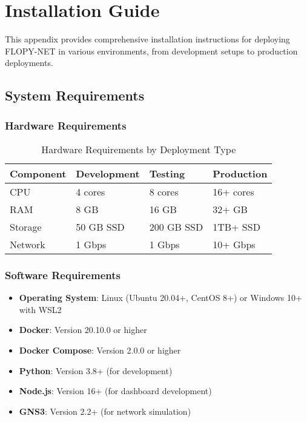 \section{Installation Guide}
\label{appendix:installation-guide}

This appendix provides comprehensive installation instructions for deploying FLOPY-NET in various environments, from development setups to production deployments.

\subsection{System Requirements}

\subsubsection{Hardware Requirements}

\begin{table}[H]
\centering
\caption{Hardware Requirements by Deployment Type}
\label{tab:hardware-requirements}
\begin{tabularx}{\textwidth}{@{}lXXX@{}}
\toprule
\textbf{Component} & \textbf{Development} & \textbf{Testing} & \textbf{Production} \\
\midrule
CPU & 4 cores & 8 cores & 16+ cores \\
RAM & 8 GB & 16 GB & 32+ GB \\
Storage & 50 GB SSD & 200 GB SSD & 1TB+ SSD \\
Network & 1 Gbps & 1 Gbps & 10+ Gbps \\
\bottomrule
\end{tabularx}
\end{table}

\subsubsection{Software Requirements}

\begin{itemize}
    \item \textbf{Operating System}: Linux (Ubuntu 20.04+, CentOS 8+) or Windows 10+ with WSL2
    \item \textbf{Docker}: Version 20.10.0 or higher
    \item \textbf{Docker Compose}: Version 2.0.0 or higher
    \item \textbf{Python}: Version 3.8+ (for development)
    \item \textbf{Node.js}: Version 16+ (for dashboard development)
    \item \textbf{GNS3}: Version 2.2+ (for network simulation)
\end{itemize}


